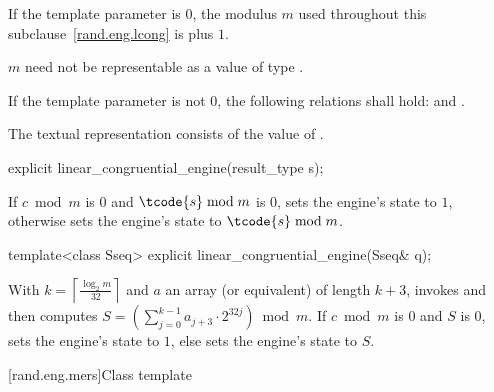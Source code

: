 \pnum
If the template parameter
 is $0$,
the modulus $m$
used throughout this subclause~\ref{rand.eng.lcong}
is  plus $1$.
\begin{note}
 $m$ need not be representable
 as a value of type .
\end{note}

\pnum
If the template parameter
 is not $0$,
the following relations shall hold:
and
  .

\pnum
The textual representation%
consists of
the value of .

%
\begin{itemdecl}
explicit linear_congruential_engine(result_type s);
\end{itemdecl}

\begin{itemdescr}
\pnum
\effects
 If $c \bmod m$ is $0$ and $\tcode{s} \bmod m$ is $0$,
 sets the engine's state to $1$,
 otherwise sets the engine's state to $\tcode{s} \bmod m$.
\end{itemdescr}

\begin{indexed}{}
\begin{itemdecl}
template<class Sseq> explicit linear_congruential_engine(Sseq& q);
\end{itemdecl}
\end{indexed}

\begin{itemdescr}
\pnum
\effects
 With
 $k = \left\lceil \frac{\log_2 m}{32} \right\rceil$
 and $a$ an array (or equivalent)
 of length $k + 3$,
 invokes 
 and then computes
 $S = \left(\sum_{j = 0}^{k - 1} a_{j + 3} \cdot 2^{32j} \right) \bmod m$.
 If $c \bmod m$ is $0$ and $S$ is $0$,
 sets the engine's state to $1$,
 else sets the engine's state
 to $S$.
\end{itemdescr}


[rand.eng.mers]{Class template }%
%

